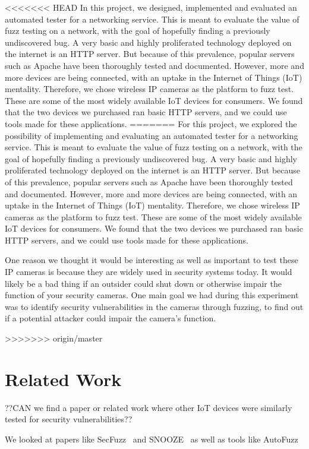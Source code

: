 \documentclass[letterpaper,twocolumn,10pt]{article}
\begin{document}
<<<<<<< HEAD
In this project, we designed, implemented and evaluated an automated tester for a networking service. This is meant to evaluate the value of fuzz testing on a network, with the goal of hopefully finding a previously undiscovered bug. A very basic and highly proliferated technology deployed on the internet is an HTTP server. But because of this prevalence, popular servers such as Apache have been thoroughly tested and documented. However, more and more devices are being connected, with an uptake in the Internet of Things (IoT) mentality. Therefore, we chose wireless IP cameras as the platform to fuzz test. These are some of the most widely available IoT devices for consumers. We found that the two devices we purchased ran basic HTTP servers, and we could use tools made for these applications. 
=======
For this project, we explored the possibility of implementing and evaluating an automated tester for a networking service. This is meant to evaluate the value of fuzz testing on a network, with the goal of hopefully finding a previously undiscovered bug. A very basic and highly proliferated technology deployed on the internet is an HTTP server. But because of this prevalence, popular servers such as Apache have been thoroughly tested and documented. However, more and more devices are being connected, with an uptake in the Internet of Things (IoT) mentality. Therefore, we chose wireless IP cameras as the platform to fuzz test. These are some of the most widely available IoT devices for consumers. We found that the two devices we purchased ran basic HTTP servers, and we could use tools made for these applications.

One reason we thought it would be interesting as well as important to test these IP cameras is because they are widely used in security systems today. It would likely be a bad thing if an outsider could shut down or otherwise impair the function of your security cameras. One main goal we had during this experiment was to identify security vulnerabilities in the cameras through fuzzing, to find out if a potential attacker could impair the camera's function.   

>>>>>>> origin/master


\section{Related Work}
??CAN we find a paper or related work where other IoT devices were similarly tested for security vulnerabilities??


We looked at papers like SecFuzz~\cite{secfuzz} and SNOOZE~\cite{snooze} as well as tools like AutoFuzz~\cite{autofuzz}
\end{document}
